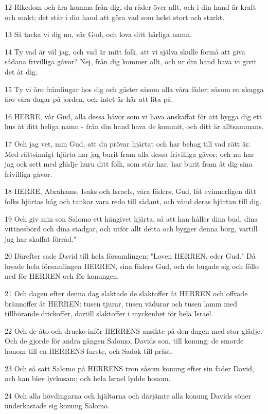 \par 12 Rikedom och ära komma från dig, du råder över allt, och i din hand är kraft och makt; det står i din hand att göra vad som helst stort och starkt.
\par 13 Så tacka vi dig nu, vår Gud, och lova ditt härliga namn.
\par 14 Ty vad är väl jag, och vad är mitt folk, att vi själva skulle förmå att giva sådana frivilliga gåvor? Nej, från dig kommer allt, och ur din hand hava vi givit det åt dig.
\par 15 Ty vi äro främlingar hos dig och gäster såsom alla våra fäder; såsom en skugga äro våra dagar på jorden, och intet är här att lita på.
\par 16 HERRE, vår Gud, alla dessa håvor som vi hava anskaffat för att bygga dig ett hus åt ditt heliga namn - från din hand hava de kommit, och ditt är alltsammans.
\par 17 Och jag vet, min Gud, att du prövar hjärtat och har behag till vad rätt är. Med rättsinnigt hjärta har jag burit fram alla dessa frivilliga gåvor; och nu har jag ock sett med glädje huru ditt folk, som står har, har burit fram åt dig sina frivilliga gåvor.
\par 18 HERRE, Abrahams, Isaks och Israels, våra fäders, Gud, låt evinnerligen ditt folks hjärtas håg och tankar vara redo till sådant, och vänd deras hjärtan till dig.
\par 19 Och giv min son Salomo ett hängivet hjärta, så att han håller dina bud, dina vittnesbörd och dina stadgar, och utför allt detta och bygger denna borg, vartill jag har skaffat förråd."
\par 20 Därefter sade David till hela församlingen: "Loven HERREN, eder Gud." Då lovade hela församlingen HERREN, sina fäders Gud, och de bugade sig och föllo ned för HERREN och för konungen.
\par 21 Och dagen efter denna dag slaktade de slaktoffer åt HERREN och offrade brännoffer åt HERREN: tusen tjurar, tusen vädurar och tusen lamm med tillhörande drickoffer, därtill slaktoffer i myckenhet för hela Israel.
\par 22 Och de åto och drucko inför HERRENS ansikte på den dagen med stor glädje. Och de gjorde för andra gången Salomo, Davids son, till konung; de smorde honom till en HERRENS furste, och Sadok till präst.
\par 23 Och så satt Salomo på HERRENS tron såsom konung efter sin fader David, och han blev lyckosam; och hela Israel lydde honom.
\par 24 Och alla hövdingarna och hjältarna och därjämte alla konung Davids söner underkastade sig konung Salomo.
